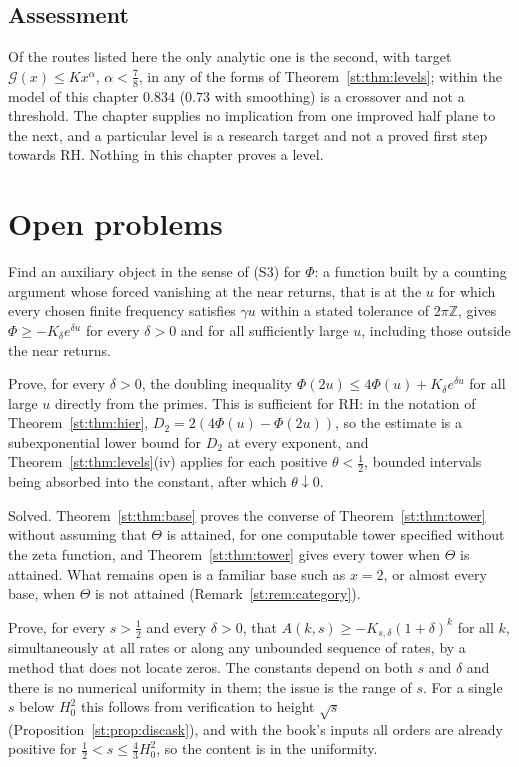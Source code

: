 \subsection{Assessment}
Of the routes listed here the only analytic one is the second, with target $\mathcal G(x)\le Kx^{\alpha}$, $\alpha<\tfrac78$, in any of the forms of Theorem~\ref{st:thm:levels}; within the model of this chapter $0.834$ ($0.73$ with smoothing) is a crossover and not a threshold. The chapter supplies no implication from one improved half plane to the next, and a particular level is a research target and not a proved first step towards RH. Nothing in this chapter proves a level.


\section{Open problems}\label{st:sec:open}
\begin{problem}\label{st:op:aux}
Find an auxiliary object in the sense of (S3) for $\Phi$: a function built by a counting argument whose forced vanishing at the near returns, that is at the $u$ for which every chosen finite frequency satisfies $\gamma u$ within a stated tolerance of $2\pi\mathbb Z$, gives $\Phi\ge-K_\delta e^{\delta u}$ for every $\delta>0$ and for all sufficiently large $u$, including those outside the near returns.
\end{problem}
\begin{problem}\label{st:op:double}
Prove, for every $\delta>0$, the doubling inequality $\Phi(2u)\le4\Phi(u)+K_\delta e^{\delta u}$ for all large $u$ directly from the primes. This is sufficient for RH: in the notation of Theorem~\ref{st:thm:hier}, $D_2=2(4\Phi(u)-\Phi(2u))$, so the estimate is a subexponential lower bound for $D_2$ at every exponent, and Theorem~\ref{st:thm:levels}(iv) applies for each positive $\theta<\tfrac12$, bounded intervals being absorbed into the constant, after which $\theta\downarrow0$.
\end{problem}
\begin{problem}\label{st:op:attain}
Solved. Theorem~\ref{st:thm:base} proves the converse of Theorem~\ref{st:thm:tower} without assuming that $\Theta$ is attained, for one computable tower specified without the zeta function, and Theorem~\ref{st:thm:tower} gives every tower when $\Theta$ is attained. What remains open is a familiar base such as $x=2$, or almost every base, when $\Theta$ is not attained (Remark~\ref{st:rem:category}).
\end{problem}
\begin{problem}\label{st:op:disc}
Prove, for every $s>\tfrac12$ and every $\delta>0$, that $A(k,s)\ge-K_{s,\delta}(1+\delta)^k$ for all $k$, simultaneously at all rates or along any unbounded sequence of rates, by a method that does not locate zeros. The constants depend on both $s$ and $\delta$ and there is no numerical uniformity in them; the issue is the range of $s$. For a single $s$ below $H_0^2$ this follows from verification to height $\sqrt s$ (Proposition~\ref{st:prop:discask}), and with the book's inputs all orders are already positive for $\tfrac12<s\le\tfrac43H_0^2$, so the content is in the uniformity.
\end{problem}

